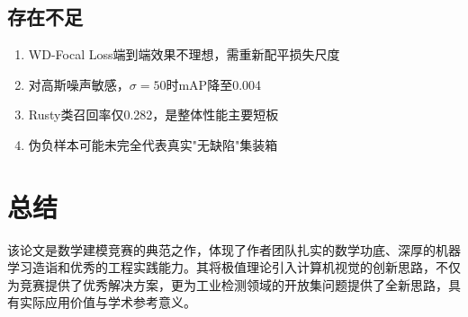 \documentclass[12pt,a4paper]{ctexart}
\theoremstyle{cumcm}
\begin{document}
\subsection{存在不足}

\begin{enumerate}[leftmargin=2.2em,itemsep=2pt]
\item WD-Focal Loss端到端效果不理想，需重新配平损失尺度
\item 对高斯噪声敏感，$\sigma=50$时mAP降至0.004
\item Rusty类召回率仅0.282，是整体性能主要短板
\item 伪负样本可能未完全代表真实"无缺陷"集装箱
\end{enumerate}

\section{总结}

该论文是数学建模竞赛的典范之作，体现了作者团队扎实的数学功底、深厚的机器学习造诣和优秀的工程实践能力。其将极值理论引入计算机视觉的创新思路，不仅为竞赛提供了优秀解决方案，更为工业检测领域的开放集问题提供了全新思路，具有实际应用价值与学术参考意义。
\end{document}
